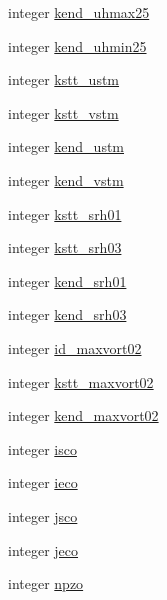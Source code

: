 \begin{DoxyCompactItemize}
\item 
integer \hyperlink{classfv__nggps__diags__mod_a412e06b26f348767682f214b1a4c9d98}{kend\-\_\-uhmax25}
\item 
integer \hyperlink{classfv__nggps__diags__mod_ab6c67f2d511df4ff9aaebbc9cd50ee0b}{kend\-\_\-uhmin25}
\item 
integer \hyperlink{classfv__nggps__diags__mod_a4ead52177a3f64c0f0e25bd5b1a0f2d0}{kstt\-\_\-ustm}
\item 
integer \hyperlink{classfv__nggps__diags__mod_a4abdf8ebb7e177ea5bbe1c78b16d9b30}{kstt\-\_\-vstm}
\item 
integer \hyperlink{classfv__nggps__diags__mod_aa4d8f69c24c8046c34dc89485c2c4569}{kend\-\_\-ustm}
\item 
integer \hyperlink{classfv__nggps__diags__mod_a3285e3b7986deb7f90ba3a8cdb5e5c7f}{kend\-\_\-vstm}
\item 
integer \hyperlink{classfv__nggps__diags__mod_ad874bf572a0671a4b9ab899687ac92da}{kstt\-\_\-srh01}
\item 
integer \hyperlink{classfv__nggps__diags__mod_a69af7c0dbc3c41d121b40a331bf37bd3}{kstt\-\_\-srh03}
\item 
integer \hyperlink{classfv__nggps__diags__mod_a78fcf7e103ecbbce2efb73cac3724aa1}{kend\-\_\-srh01}
\item 
integer \hyperlink{classfv__nggps__diags__mod_a7ed4ac96d6427e52194a7b6068868d4f}{kend\-\_\-srh03}
\item 
integer \hyperlink{classfv__nggps__diags__mod_a413e171814995c4a4564b3456e555289}{id\-\_\-maxvort02}
\item 
integer \hyperlink{classfv__nggps__diags__mod_a787967d9782109f77ea6e5eff2806d6d}{kstt\-\_\-maxvort02}
\item 
integer \hyperlink{classfv__nggps__diags__mod_a92c55d7b8d59128cd1252c604178154a}{kend\-\_\-maxvort02}
\item 
integer \hyperlink{classfv__nggps__diags__mod_a6dc04c934787487f49e805ba7e0d02d9}{isco}
\item 
integer \hyperlink{classfv__nggps__diags__mod_aaa0060794882b98c8a6bab0cff1c49d7}{ieco}
\item 
integer \hyperlink{classfv__nggps__diags__mod_a5b3666ef22265e7fd39b94fc8c874807}{jsco}
\item 
integer \hyperlink{classfv__nggps__diags__mod_a7e0188e6cd56b04d9496a771a61ab691}{jeco}
\item 
integer \hyperlink{classfv__nggps__diags__mod_a34ced43246de58031ac0f5bc43d7f043}{npzo}
\item 

\end{DoxyCompactItemize}
